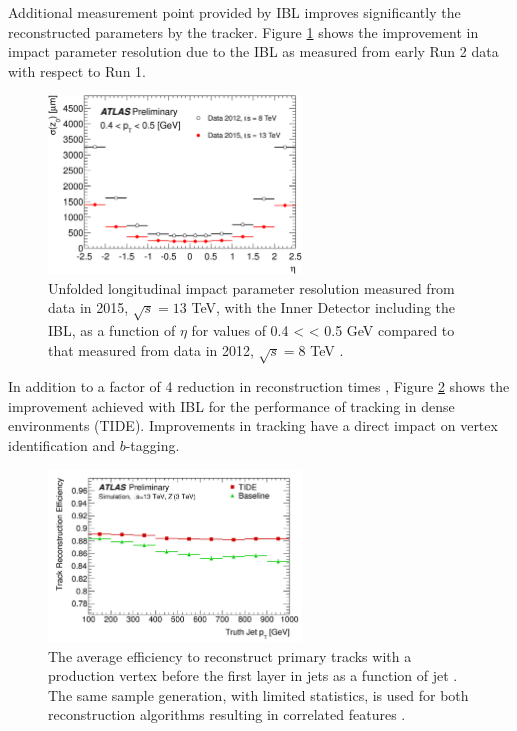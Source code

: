 Additional measurement point provided by IBL improves significantly the reconstructed parameters by the tracker. Figure \ref{fig:chap2:ATLAS:ITK:IBL:Imp} shows the improvement in impact parameter resolution due to the IBL as measured from early Run 2 data with respect to Run 1. 
\begin{figure}[ht]
    \centering
    \includegraphics[width=0.6\textwidth]{Ch2/Img/IBL_impact.png}
    \caption{Unfolded longitudinal impact parameter resolution measured from data in 2015, $\sqrt{s}= 13$ TeV, with the Inner Detector including the IBL, as a function of $\eta$  for values of 0.4 < \pT < 0.5 GeV compared to that measured from data in 2012, $\sqrt{s} = 8$ TeV \cite{IBL_IP}.}
    \label{fig:chap2:ATLAS:ITK:IBL:Imp}
\end{figure}
In addition to a factor of 4 reduction in reconstruction times \cite{IBL_Time}, Figure \ref{fig:chap2:ATLAS:ITK:IBL:Trk} shows the improvement achieved with IBL for the performance of tracking in dense environments (TIDE). Improvements in tracking have a direct impact on vertex identification and $b$-tagging. 
\begin{figure}[ht]
    \centering
    \includegraphics[width=0.6\textwidth]{Ch2/Img/IBL_track.png}
    \caption{The average efficiency to reconstruct primary tracks with a production vertex before the first layer in jets as a function of jet \pT. The same sample generation, with limited statistics, is used for both reconstruction algorithms resulting in correlated features \cite{IBL_Trk}.}
    \label{fig:chap2:ATLAS:ITK:IBL:Trk}
\end{figure}
